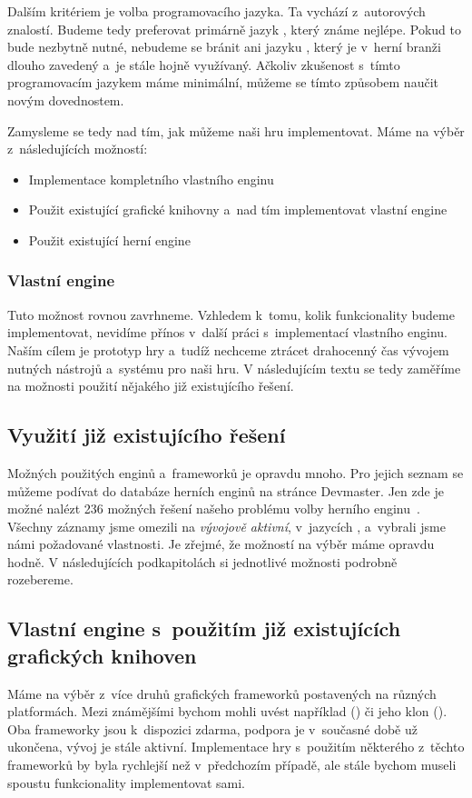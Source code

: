 Dalším kritériem je volba programovacího jazyka. Ta vychází z~autorových znalostí. Budeme tedy preferovat primárně jazyk \CS{}, který známe nejlépe. Pokud to bude nezbytně nutné, nebudeme se bránit ani jazyku \CPP{}, který je v~herní branži dlouho zavedený a~je stále hojně využívaný. Ačkoliv zkušenost s~tímto programovacím jazykem máme minimální, můžeme se tímto způsobem naučit novým dovednostem.


Zamysleme se tedy nad tím, jak můžeme naši hru implementovat. Máme na výběr z~následujících možností:
\begin{itemize}
	\item Implementace kompletního vlastního enginu
	\item Použit existující grafické knihovny a~nad tím implementovat vlastní engine
	\item Použit existující herní engine
\end{itemize}

\subsubsection{Vlastní engine}
Tuto možnost rovnou zavrhneme. Vzhledem k~tomu, kolik funkcionality budeme implementovat, nevidíme přínos v~další práci s~implementací vlastního enginu. Naším cílem je prototyp hry a~tudíž nechceme ztrácet drahocenný čas vývojem nutných nástrojů a~systému pro naši hru. V následujícím textu se tedy zaměříme na možnosti použití nějakého již existujícího řešení.


\subsection{Využití již existujícího řešení}
Možných použitých enginů a~frameworků je opravdu mnoho. Pro jejich seznam se můžeme podívat do databáze herních enginů na stránce Devmaster. Jen zde je možné nalézt 236 možných řešení našeho problému volby herního enginu~\citep{engines_list}. Všechny záznamy jsme omezili na \textit{vývojově aktivní}, v~jazycích \CS{}, \CPP{} a~vybrali jsme námi požadované vlastnosti.
Je zřejmé, že možností na výběr máme opravdu hodně. V následujících podkapitolách si jednotlivé možnosti podrobně rozebereme.




\subsection{Vlastní engine s~použitím již existujících grafických knihoven}
Máme na výběr z~více druhů grafických frameworků postavených na různých platformách. Mezi známějšími bychom mohli uvést například \XNA{} (\CS{}) či jeho klon \MG{} (\CS{}). Oba frameworky jsou k~dispozici zdarma, podpora \XNA{} je v~současné době už ukončena, vývoj \MG{} je stále aktivní. Implementace hry s~použitím některého z~těchto frameworků by byla rychlejší než v~předchozím případě, ale stále bychom museli spoustu funkcionality implementovat sami. 

